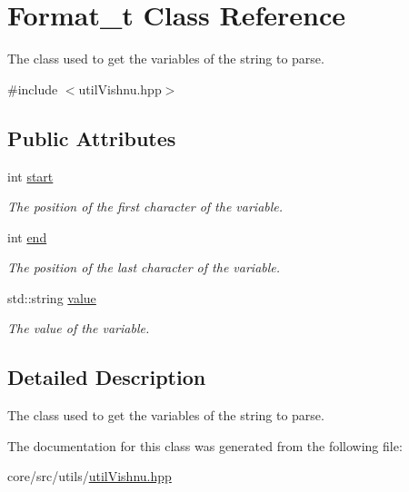 \hypertarget{classFormat__t}{
\section{Format\_\-t Class Reference}
\label{classFormat__t}
}


The class used to get the variables of the string to parse.  




{\ttfamily \#include $<$utilVishnu.hpp$>$}

\subsection*{Public Attributes}
\begin{DoxyCompactItemize}
\item 
\hypertarget{classFormat__t_a1f2650b547e8e887adfa64fb66586221}{
int \hyperlink{classFormat__t_a1f2650b547e8e887adfa64fb66586221}{start}}
\label{classFormat__t_a1f2650b547e8e887adfa64fb66586221}

\begin{DoxyCompactList}\small\item\em The position of the first character of the variable. \item\end{DoxyCompactList}\item 
\hypertarget{classFormat__t_a1c612c68847a8987b5148f223b87ebca}{
int \hyperlink{classFormat__t_a1c612c68847a8987b5148f223b87ebca}{end}}
\label{classFormat__t_a1c612c68847a8987b5148f223b87ebca}

\begin{DoxyCompactList}\small\item\em The position of the last character of the variable. \item\end{DoxyCompactList}\item 
\hypertarget{classFormat__t_a9545825afdecf274b3b52d023e303bc0}{
std::string \hyperlink{classFormat__t_a9545825afdecf274b3b52d023e303bc0}{value}}
\label{classFormat__t_a9545825afdecf274b3b52d023e303bc0}

\begin{DoxyCompactList}\small\item\em The value of the variable. \item\end{DoxyCompactList}\end{DoxyCompactItemize}


\subsection{Detailed Description}
The class used to get the variables of the string to parse. 

The documentation for this class was generated from the following file:\begin{DoxyCompactItemize}
\item 
core/src/utils/\hyperlink{utilVishnu_8hpp}{utilVishnu.hpp}\end{DoxyCompactItemize}
